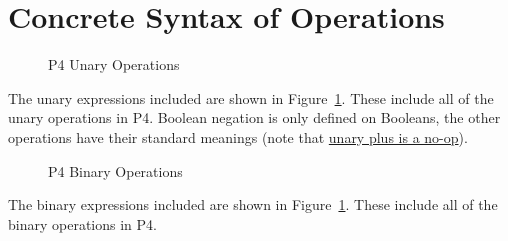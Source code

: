 \documentclass[UTF8]{article}
\begin{document}
\printbibliography

\clearpage
\appendix
\section{Concrete Syntax of Operations}
\label{app:op}
\begin{figure}[ht!]
\centering\ottgrammartabular{
\ottunop\ottafterlastrule
}
\caption{P4 Unary Operations}
\label{fig:unop}
\end{figure}

The unary expressions included are shown in Figure~\ref{fig:unop}. These include all of the unary operations in P4. Boolean negation is only defined on Booleans, the other operations have their standard meanings (note that \href{https://p4.org/p4-spec/docs/P4-16-v1.2.1.html#sec-bit-ops}{unary plus is a no-op}).

\newpage
\begin{figure}[ht!]
\centering\ottgrammartabular{
\ottbinop\ottafterlastrule
}
\caption{P4 Binary Operations}
\label{fig:binop}
\end{figure}

The binary expressions included are shown in Figure~\ref{fig:unop}. These include all of the binary operations in P4.
\end{document}
